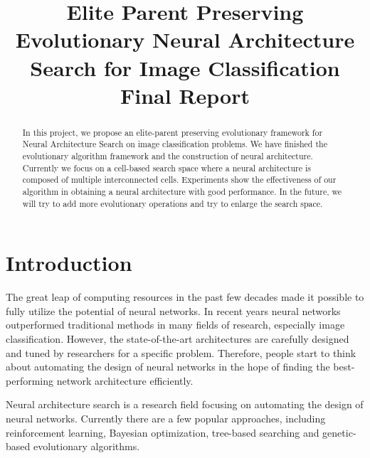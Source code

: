 \documentclass[conference]{IEEEtran}
\begin{document}
  
  \title{Elite Parent Preserving Evolutionary Neural Architecture Search for Image Classification \\ Final Report}
  
  \author{
  }
  
  \maketitle
  
  \begin{abstract}
  In this project, we propose an elite-parent preserving evolutionary framework for Neural Architecture Search on image classification problems. We have finished the evolutionary algorithm framework and the construction of neural architecture. Currently we focus on a cell-based search space where a neural architecture is composed of multiple interconnected cells. Experiments show the effectiveness of our algorithm in obtaining a neural architecture with good performance. In the future, we will try to add more evolutionary operations and try to enlarge the search space.
  \end{abstract}
  \IEEEpeerreviewmaketitle
  
  \section{Introduction}
      The great leap of computing resources in the past few decades made it possible to fully utilize the potential of neural networks. In recent years neural networks outperformed traditional methods in many fields of research, especially image classification. However, the state-of-the-art architectures are carefully designed and tuned by researchers for a specific problem. Therefore, people start to think about automating the design of neural networks in the hope of finding the best-performing network architecture efficiently.

      Neural architecture search is a research field focusing on automating the design of neural networks. Currently there are a few popular approaches, including reinforcement learning, Bayesian optimization, tree-based searching and genetic-based evolutionary algorithms. 
\end{document}
